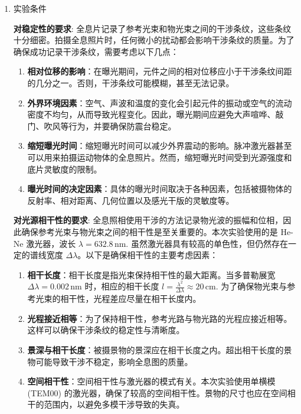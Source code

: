 \documentclass[dvipsnames, svgnames,a4paper,11pt]{article}
\begin{document}
\begin{enumerate}
				
			\item 实验条件
				
				\textbf{对稳定性的要求}:
				全息片记录了参考光束和物光束之间的干涉条纹，这些条纹十分细密。拍摄全息照片时，任何微小的扰动都会影响干涉条纹的质量。为了确保成功记录干涉条纹，需要考虑以下几点：

				\begin{enumerate}
				  \item \textbf{相对位移的影响}：在曝光期间，元件之间的相对位移应小于干涉条纹间距的几分之一。否则，干涉条纹可能模糊，甚至无法记录。
				  
				  \item \textbf{外界环境因素}：空气、声波和温度的变化会引起元件的振动或空气的流动密度不均匀，从而导致光程变化。因此，曝光期间应避免大声喧哗、敲门、吹风等行为，并要确保防震台稳定。
				  
				  \item \textbf{缩短曝光时间}：缩短曝光时间可以减少外界震动的影响。脉冲激光器甚至可以用来拍摄运动物体的全息照片。然而，缩短曝光时间受到光源强度和底片灵敏度的限制。
				  
				  \item \textbf{曝光时间的决定因素}：具体的曝光时间取决于各种因素，包括被摄物体的反射率、相对距离、几何位置以及感光干版的灵敏度等。
				  
				\end{enumerate}
		 
				\textbf{对光源相干性的要求}:
				全息照相使用干涉的方法记录物光波的振幅和位相，因此确保参考光束与物光束之间的相干性是至关重要的。本次实验使用的是 He-Ne 激光器，波长 $\lambda = 632.8 \, \text{nm}$. 虽然激光器具有较高的单色性，但仍然存在一定的谱线宽度 $\Delta \lambda$。以下是确保相干性的主要考虑因素：

				\begin{enumerate}
				  \item \textbf{相干长度}：相干长度是指光束保持相干性的最大距离。当多普勒展宽 $\Delta \lambda = 0.002 \, \text{nm}$ 时，相应的相干长度 $l = \frac{\lambda^2}{\Delta \lambda} \approx 20 \, \text{cm}$. 为了确保物光束与参考光束的相干性，光程差应尽量在相干长度内。
				  
				  \item \textbf{光程接近相等}：为了保持相干性，参考光路与物光路的光程应接近相等。这样可以确保干涉条纹的稳定性与清晰度。
				  
				  \item \textbf{景深与相干长度}：被摄景物的景深应在相干长度之内。超出相干长度的景物可能导致干涉不稳定，影响全息图的质量。
				  
				  \item \textbf{空间相干性}：空间相干性与激光器的模式有关。本次实验使用单横模 (TEM00) 的激光器，确保了较高的空间相干性。景物的尺寸也应在空间相干的范围内，以避免多模干涉导致的失真。
				  
				\end{enumerate}
	
				
	
		\end{enumerate}
	
\end{document}
